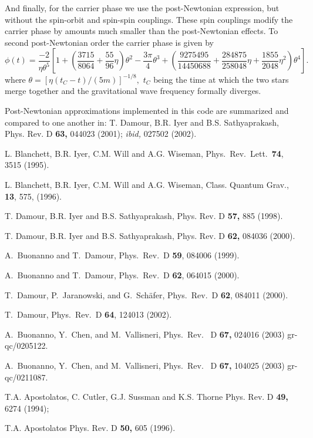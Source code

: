 And finally, for the carrier phase we use the post-Newtonian 
expression, but without the spin-orbit and
spin-spin couplings. These spin couplings modify the carrier phase 
by amounts much smaller than the post-Newtonian effects.
To second post-Newtonian order the carrier phase is given by
\begin{equation}
\phi(t) = 
\frac{-2}{\eta\theta^5}\left[1+\left(\frac{3715}{8064}+\frac
{55}{96}\eta\right)\theta^2-\frac{3\pi}{4}\theta^3 
+\left(\frac{9275495}{14450688}+\frac{284875}{258048}\eta+\frac{1855}{2048}\eta^2\right)\theta^4\right].
\label{eqn:phi}
\end{equation}
where $\theta=[\eta (t_C-t)/(5m)]^{-1/8},$ $t_C$ being the time at which the two stars
merge together and the gravitational wave frequency formally diverges.


\newpage
\begin{thebibliography}{}
 Post-Newtonian approximations implemented in this code are 
summarized and compared to one another in: 
T. Damour, B.R. Iyer and B.S. Sathyaprakash, 
Phys. Rev. D {\bf 63,} 044023 (2001); {\em ibid,} 027502 (2002).

L. Blanchett, B.R. Iyer, C.M. Will and A.G. Wiseman, 
Phys.\ Rev.\ Lett.\ {\bf 74}, 3515 (1995).

L. Blanchett, B.R. Iyer, C.M. Will and A.G. Wiseman, 
Class. Quantum Grav., {\bf 13}, 575, (1996).

 T. Damour, B.R. Iyer and B.S. Sathyaprakash, 
Phys. Rev. D {\bf 57,} 885 (1998). 

 T. Damour, B.R. Iyer and B.S. Sathyaprakash, 
Phys. Rev. D {\bf 62,} 084036 (2000). 

A.\ Buonanno and T.\ Damour,
Phys.\ Rev.\ D {\bf 59}, 084006 (1999).

A.\ Buonanno and T.\ Damour,
Phys.\ Rev.\ D {\bf 62}, 064015 (2000). 

T.\ Damour, P.\ Jaranowski, and G.\ Sch\"afer,
Phys.\ Rev.\ D {\bf 62}, 084011 (2000).

T.\ Damour,
Phys.\ Rev.\ D {\bf 64}, 124013 (2002).

A.\ Buonanno, Y.\ Chen, and M.\ Vallisneri,
Phys.\ Rev. \ D {\bf 67,} 024016 (2003)
gr-qc/0205122.

A.\ Buonanno, Y.\ Chen, and M.\ Vallisneri,
Phys.\ Rev. \ D {\bf 67,} 104025 (2003)
gr-qc/0211087.

T.A. Apostolatos, C. Cutler, G.J. Sussman
and K.S. Thorne Phys. Rev. D {\bf 49,} 6274 (1994);

T.A. Apostolatos Phys. Rev. D {\bf 50,} 605 (1996).

\end{thebibliography}
